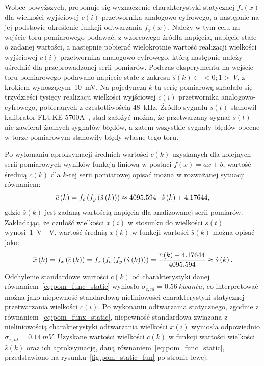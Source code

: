 Wobec powyższych, proponuje się wyznaczenie charakterystyki statycznej $f_{c}(x)$ dla wielkości wyjściowej $c(i)$ przetwornika analogowo-cyfrowego, a następnie na jej podstawie określenie funkcji odtwarzania $f_{x}(x)$. Należy w tym celu na wejście toru pomiarowego podawać, z wzorcowego źródła napięcia, napięcie stałe o zadanej wartości, a następnie pobierać wielokrotnie wartość realizacji wielkości wyjściowej $c(i)$ przetwornika analogowo-cyfrowego, którą następnie należy uśrednić dla przeprowadzonej serii pomiarów. Podczas eksperymentu na wejście toru pomiarowego podawano napięcie stałe z zakresu $\hat{s}(k) \in~<0;1>~\unit{V}$, z krokiem wynoszącym~\qty{10}{mV}. Na pojedynczą $k$-tą serię pomiarową składało się trzydzieści tysięcy realizacji wielkości wyjściowej $c(i)$ przetwornika analogowo-cyfrowego, pobieranych z częstotliwością \qty{48}{kHz}. Źródło sygnału $s(t)$ stanowił kalibrator FLUKE 5700A~\cite{fluke_manual}, stąd założyć można, że przetwarzany sygnał $s(t)$ nie zawierał żadnych sygnałów błędów, a zatem wszystkie sygnały błędów obecne w torze pomiarowym stanowiły błędy własne tego toru.

Po wykonaniu aproksymacji średnich wartości $\overline{c}(k)$ uzyskanych dla kolejnych serii pomiarowych wyników funkcją liniową w postaci $f(x) = ax + b$, wartość średnią $\overline{c}(k)$ dla $k$-tej serii pomiarowej opisać można w rozważanej sytuacji równaniem:
\begin{equation}
\overline{c} \left(k\right) = f_{c} \left(f_{y} \left(\hat{s} \left(k\right)\right)\right) \approx 4095.594 \cdot \hat{s} \left(k\right) + 4.17644 \label{eq:pom_func_static},
\end{equation}
gdzie $\hat{s}(k)$ jest zadaną wartością napięcia dla analizowanej serii pomiarów. Zakładając, że czułość wielkości $x(i)$ w stosunku do wielkości $s(t)$ wynosi~\qty{1}{V \per V}, wartość średnią $\overline{x}(k)$ w funkcji wartości $\hat{s}(k)$ można opisać jako:
\begin{equation}
\overline{x} \left(k\right) = f_{x} \left(\overline{c} \left(k\right)\right) = f_{x} \left(f_{c} \left(f_{y} \left(\hat{s} \left(k\right)\right)\right)\right) = \frac{\overline{c} \left(k\right) - 4.17644}{4095.594} \approx \hat{s} \left(k\right) \label{eq:pom_funx_static}.
\end{equation}
Odchylenie standardowe wartości $\overline{c}(k)$ od charakterystyki danej równaniem~\eqref{eq:pom_func_static} wyniosło $\sigma_{c,nl} = \qty{0.56}{kwantu}$, co interpretować można jako niepewność standardową nieliniowości charakterystyki statycznej przetwarzania wielkości $c(i)$. Po wykonaniu odtwarzania statycznego, zgodnie z równaniem~\eqref{eq:pom_funx_static}, niepewność standardowa związana z nieliniowością charakterystyki odtwarzania wielkości $x(i)$ wyniosła odpowiednio $\sigma_{x,nl} = \qty{0.14}{mV}$. Uzyskane wartości wielkości $\overline{c}(k)$ w funkcji wartości wielkości $\hat{s}(k)$ oraz ich aproksymację, daną równaniem~\eqref{eq:pom_func_static}, przedstawiono na rysunku~\ref{fig:pom_static_fun} po stronie lewej.

